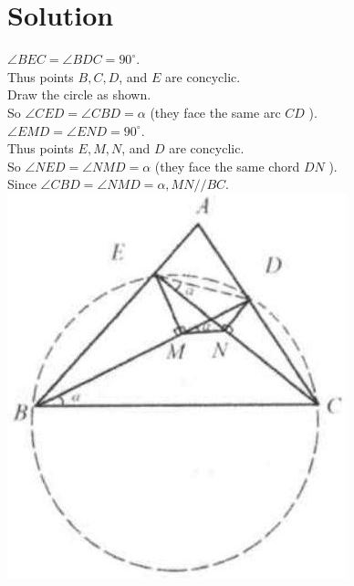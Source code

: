 \documentclass{article}
\begin{document}
\section*{Solution}
\(\angle B E C=\angle B D C=90^{\circ}\).\\
Thus points \(B, C, D\), and \(E\) are concyclic.\\
Draw the circle as shown.\\
So \(\angle C E D=\angle C B D=\alpha\) (they face the same arc \(C D\) ).\\
\(\angle E M D=\angle E N D=90^{\circ}\).\\
Thus points \(E, M, N\), and \(D\) are concyclic.\\
So \(\angle N E D=\angle N M D=\alpha\) (they face the same chord \(D N\) ).\\
Since \(\angle C B D=\angle N M D=\alpha, M N / / B C\).\\
\centering
\includegraphics[width=\textwidth]{images/210(2).jpg}
\end{document}
